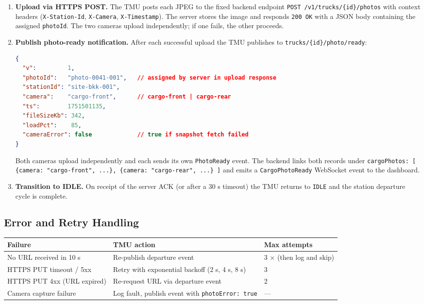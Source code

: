 \documentclass{article}
\begin{document}
\begin{enumerate}[leftmargin=*, label=\textbf{Step \arabic*.}]
    \item \textbf{Upload via HTTPS POST.}
    The TMU posts each JPEG to the fixed backend endpoint
    \texttt{POST /v1/trucks/\{id\}/photos} with context headers
    (\texttt{X-Station-Id}, \texttt{X-Camera}, \texttt{X-Timestamp}).
    The server stores the image and responds \texttt{200 OK} with a
    JSON body containing the assigned \texttt{photoId}.
    The two cameras upload independently; if one fails, the other proceeds.

    \item \textbf{Publish photo-ready notification.}
    After each successful upload the TMU publishes to
    \texttt{trucks/\{id\}/photo/ready}:

    \begin{lstlisting}[language=json, caption=PhotoReady notification (one per camera)]
{
  "v":         1,
  "photoId":   "photo-0041-001",   // assigned by server in upload response
  "stationId": "site-bkk-001",
  "camera":    "cargo-front",      // cargo-front | cargo-rear
  "ts":        1751501135,
  "fileSizeKb": 342,
  "loadPct":    85,
  "cameraError": false             // true if snapshot fetch failed
}
    \end{lstlisting}

    \noindent Both cameras upload independently and each sends its own
    \texttt{PhotoReady} event. The backend links both records under
    \texttt{cargoPhotos: [ \{camera: "cargo-front", ...\},
    \{camera: "cargo-rear", ...\} ]} and emits a \texttt{CargoPhotoReady}
    WebSocket event to the dashboard.

    \item \textbf{Transition to IDLE.}
    On receipt of the server ACK (or after a 30 s timeout) the TMU returns to
    \texttt{IDLE} and the station departure cycle is complete.

\end{enumerate}

\subsection{Error and Retry Handling}

\begin{center}
\begin{tabular}{lll}
\toprule
\textbf{Failure} & \textbf{TMU action} & \textbf{Max attempts}\\
\midrule
No URL received in 10 s    & Re-publish departure event & 3 $\times$ (then log and skip)\\
HTTPS PUT timeout / 5xx    & Retry with exponential backoff (2 s, 4 s, 8 s) & 3\\
HTTPS PUT 4xx (URL expired)& Re-request URL via departure event & 2\\
Camera capture failure     & Log fault, publish event with \texttt{photoError: true} & ---\\
\bottomrule
\end{tabular}
\end{center}
\end{document}

